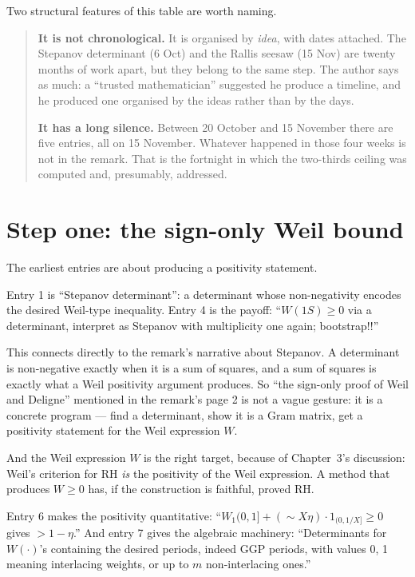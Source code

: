 Two structural features of this table are worth naming.

\begin{quote}
\textbf{It is not chronological.} It is organised by \emph{idea}, with dates
attached. The Stepanov determinant (6 Oct) and the Rallis seesaw (15 Nov) are
twenty months of work apart, but they belong to the same step. The author says
as much: a ``trusted mathematician'' suggested he produce a timeline, and he
produced one organised by the ideas rather than by the days.

\textbf{It has a long silence.} Between 20 October and 15 November there are
five entries, all on 15 November. Whatever happened in those four weeks is not
in the remark. That is the fortnight in which the two-thirds ceiling was
computed and, presumably, addressed.
\end{quote}

\section{Step one: the sign-only Weil bound}The earliest entries are about producing a positivity statement.

Entry 1 is ``Stepanov determinant'': a determinant whose non-negativity encodes
the desired Weil-type inequality. Entry 4 is the payoff: ``$W(1S) \ge 0$ via a
determinant, interpret as Stepanov with multiplicity one again; bootstrap!!''

This connects directly to the remark's narrative about Stepanov. A determinant
is non-negative exactly when it is a sum of squares, and a sum of squares is
exactly what a Weil positivity argument produces. So ``the sign-only proof of
Weil and Deligne'' mentioned in the remark's page 2 is not a vague gesture: it
is a concrete program --- find a determinant, show it is a Gram matrix, get a
positivity statement for the Weil expression $W$.

And the Weil expression $W$ is the right target, because of Chapter~3's
discussion: Weil's criterion for RH \emph{is} the positivity of the Weil
expression. A method that produces $W \ge 0$ has, if the construction is
faithful, proved RH.

Entry 6 makes the positivity quantitative: ``$W_1(0,1] + (\sim X\eta)\cdot
1_{(0,1/X]} \ge 0$ gives $> 1 - \eta$.'' And entry 7 gives the algebraic
machinery: ``Determinants for $W(\cdot)$'s containing the desired periods,
indeed GGP periods, with values 0, 1 meaning interlacing weights, or up to $m$
non-interlacing ones.''

